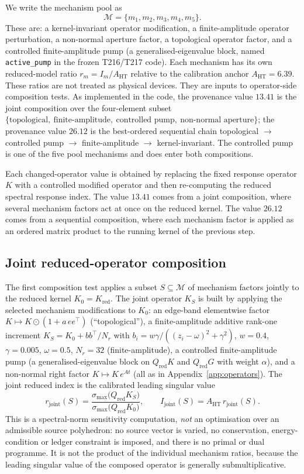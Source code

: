 \documentclass[11pt,a4paper]{article}
\begin{document}
We write the mechanism pool as
\[
\mathcal{M} = \{m_{1},m_{2},m_{3},m_{4},m_{5}\}.
\]
These are: a kernel-invariant operator modification, a finite-amplitude operator perturbation, a non-normal aperture factor, a topological operator factor, and a controlled finite-amplitude pump (a generalised-eigenvalue block, named \texttt{active\_pump} in the frozen T216/T217 code). Each mechanism has its own reduced-model ratio $r_{m}=I_{m}/A_{\mathrm{HT}}$ relative to the calibration anchor $A_{\mathrm{HT}}=6.39$. These ratios are not treated as physical devices. They are inputs to operator-side composition tests. As implemented in the code, the provenance value $13.41$ is the joint composition over the four-element subset $\{\text{topological},\ \text{finite-amplitude},\ \text{controlled pump},\ \text{non-normal aperture}\}$; the provenance value $26.12$ is the best-ordered sequential chain topological $\to$ controlled pump $\to$ finite-amplitude $\to$ kernel-invariant. The controlled pump is one of the five pool mechanisms and does enter both compositions.

Each changed-operator value is obtained by replacing the fixed response operator $K$ with a controlled modified operator and then re-computing the reduced spectral response index. The value $13.41$ comes from a joint composition, where several mechanism factors act at once on the reduced kernel. The value $26.12$ comes from a sequential composition, where each mechanism factor is applied as an ordered matrix product to the running kernel of the previous step.

\subsection{Joint reduced-operator composition}

The first composition test applies a subset $S\subseteq\mathcal{M}$ of mechanism factors jointly to the reduced kernel $K_{0}=K_{\mathrm{red}}$. The joint operator $K_{S}$ is built by applying the selected mechanism modifications to $K_{0}$: an edge-band elementwise factor $K\mapsto K\odot(1+a\,ee^{\top})$ (``topological''), a finite-amplitude additive rank-one increment $K_{S}=K_{0}+bb^{\top}/N_{r}$ with $b_{i}=w\gamma/((z_{i}-\omega)^{2}+\gamma^{2})$, $w=0.4$, $\gamma=0.005$, $\omega=0.5$, $N_{r}=32$ (finite-amplitude), a controlled finite-amplitude pump (a generalised-eigenvalue block on $Q_{\mathrm{red}}K$ and $Q_{\mathrm{red}}G$ with weight $\alpha$), and a non-normal right factor $K\mapsto K\,e^{At}$ (all as in Appendix~\ref{app:operators}). The joint reduced index is the calibrated leading singular value
\[
r_{\mathrm{joint}}(S) = \frac{\sigma_{\max}\!\bigl(Q_{\mathrm{red}}K_{S}\bigr)}{\sigma_{\max}\!\bigl(Q_{\mathrm{red}}K_{0}\bigr)},
\qquad
I_{\mathrm{joint}}(S) = A_{\mathrm{HT}}\,r_{\mathrm{joint}}(S).
\]
This is a spectral-norm sensitivity computation, \emph{not} an optimisation over an admissible source polyhedron: no source vector is varied, no conservation, energy-condition or ledger constraint is imposed, and there is no primal or dual programme. It is not the product of the individual mechanism ratios, because the leading singular value of the composed operator is generally submultiplicative.
\end{document}
